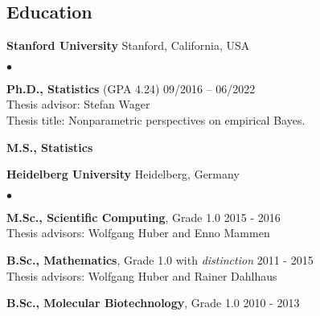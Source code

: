 \documentclass[margin,line]{res}
\newenvironment{list2}{
  \begin{list}{$\bullet$}{%
      \setlength{\itemsep}{0in}
      \setlength{\parsep}{0in} \setlength{\parskip}{0in}
      \setlength{\topsep}{0in} \setlength{\partopsep}{0in}
      \setlength{\leftmargin}{0.2in}}}{\end{list}}
\begin{document}
\begin{resume}
\section{\sc Education}
{\bf Stanford University} \hfill Stanford, California, USA\\
\vspace*{-.14in}
\begin{list2}
\item
\textbf{Ph.D., Statistics}  (GPA 4.24) \hfill  09/2016 -- 06/2022\\
Thesis advisor: Stefan Wager\\
Thesis title: Nonparametric perspectives on empirical Bayes.
\item \textbf{M.S., Statistics}
\end{list2}

\vspace*{-2.5mm}
{\bf {Heidelberg University}} \hfill  {Heidelberg, Germany}\\
\vspace*{-.14in}
\begin{list2}
\item \textbf{M.Sc.,  Scientific Computing}, Grade 1.0 \hfill 2015 - 2016\\
Thesis advisors: Wolfgang Huber and Enno Mammen
\item \textbf{B.Sc., Mathematics}, Grade 1.0 with \emph{distinction} \hfill 2011 - 2015\\
Thesis advisors: Wolfgang Huber and Rainer Dahlhaus
\item \textbf{B.Sc., Molecular Biotechnology}, Grade 1.0 \hfill 2010 - 2013
\end{list2}



\end{resume}
\end{document}
